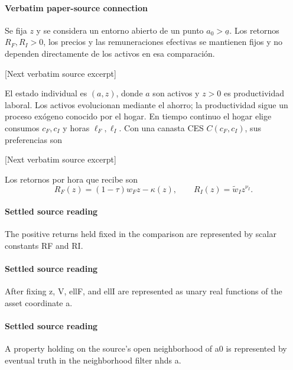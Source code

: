 \documentclass[10pt]{article}
\begin{document}
\paragraph{Verbatim paper-source connection}
\begin{ReviewVerbatim}
\begin{assumption}\label{ass:fixed}
Se fija \(z\) y se considera un entorno abierto de un punto \(a_0>\underline a\). Los retornos \(R_F,R_I>0\), los precios y las remuneraciones efectivas se mantienen fijos y no dependen directamente de los activos en esa comparación.
\end{assumption}

[Next verbatim source excerpt]

El estado individual es \((a,z)\), donde \(a\) son activos y \(z>0\) es productividad laboral. Los activos evolucionan mediante el ahorro; la productividad sigue un proceso exógeno conocido por el hogar. En tiempo continuo el hogar elige consumos \(c_F,c_I\) y horas \(\ell_F,\ell_I\). Con una canasta CES \(C(c_F,c_I)\), sus preferencias son

[Next verbatim source excerpt]

Los retornos por hora que recibe son
\begin{equation}\label{eq:returns}
R_F(z)=(1-\tau)w_Fz-\kappa(z),\qquad
R_I(z)=\widetilde w_Iz^{\nu_I}.
\end{equation}
\end{ReviewVerbatim}

\paragraph{Settled source reading}
\begin{sloppypar}
The positive returns held fixed in the comparison are represented by scalar constants RF and RI.\allowbreak{}
\end{sloppypar}
\paragraph{Settled source reading}
\begin{sloppypar}
After fixing z, V, ellF, and ellI are represented as unary real functions of the asset coordinate a.\allowbreak{}
\end{sloppypar}
\paragraph{Settled source reading}
\begin{sloppypar}
A property holding on the source's open neighborhood of a0 is represented by eventual truth in the neighborhood filter nhds a.\allowbreak{}
\end{sloppypar}
\end{document}
